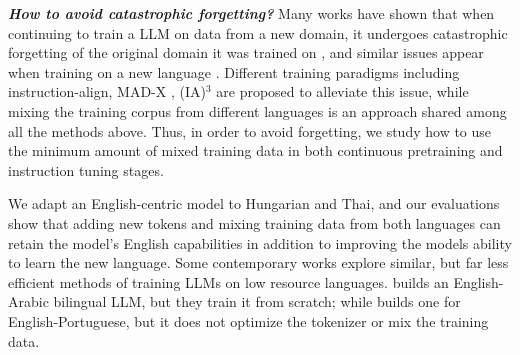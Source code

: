 \textbf{\emph{How to avoid catastrophic forgetting?}} Many works have shown that when continuing to train a LLM on data from a new domain, it undergoes catastrophic forgetting of the original domain it was trained on \cite{french1999catastrophic}, and similar issues appear when training on a new language \cite{french1999catastrophic, yong2023bloom1, cahyawijaya2023instructalign, muennighoff2023crosslingual, chalkidis2021multieurlex, phang2020english, vu2022overcoming}. Different training paradigms including instruction-align\cite{cahyawijaya2023instructalign}, MAD-X \cite{pfeiffer-etal-2020-mad}, (IA)$^3$ \cite{liu2022few} are proposed to alleviate this issue, 
while mixing the training corpus from different languages \cite{yong2023bloom1, ebrahimi2021adapt, ogueji2021small, pires2023sabia, ye2023language, armengolestapé2021multilingual} is an approach shared among all the methods above. 
Thus, in order to avoid forgetting, we study how to use the minimum amount of mixed training data in both continuous pretraining and instruction tuning stages.

We adapt an English-centric model to Hungarian and Thai, and our evaluations show that adding new tokens and mixing training data from both languages can retain the model's English capabilities in addition to improving the models ability to learn the new language. Some contemporary works explore similar, but far less efficient methods of training LLMs on low resource languages. \cite{sengupta2023jais} builds an English-Arabic bilingual LLM, but they train it from scratch; while \cite{pires2023sabia} builds one for English-Portuguese, but it does not optimize the tokenizer or mix the training data.  